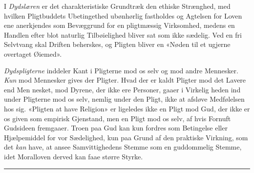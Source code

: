 \documentclass[12pt,a4paper]{book}
\newcommand{\divrule}{\begin{center}\rule{2cm}{0.4pt}\end{center}}
\begin{document}
I \emph{Dydslæren} er det charakteristiske Grundtræk den
ethiske Strænghed, med hvilken Pligtbuddets Ubetingethed
ubønhørlig fastholdes og Agtelsen for Loven ene anerkjendes
som Bevæggrund for en pligtmæssig Virksomhed, medens en
Handlen efter blot naturlig Tilbøielighed bliver sat som ikke\-%
sædelig. Ved en fri Selvtvang skal Driften beherskes, og
Pligten bliver en «Nøden til et ugjerne overtaget Øiemed».

\emph{Dydspligterne} inddeler Kant i Pligterne mod os selv
og mod andre Mennesker. \emph{Kun} mod Mennesker gives der
Pligter. Hvad der er kaldt Pligter mod det Lavere end Men\-%
nesket, mod Dyrene, der ikke ere Personer, gaaer i Virkelig\-%
heden ind under Pligterne mod os selv, nemlig under den
Pligt, ikke at afsløve Medfølelsen hos sig. «Pligten at have
Religion» er ligeledes ikke en Pligt mod Gud, der ikke er os
given som empirisk Gjenstand, men en Pligt mod os selv, af hvis
Fornuft Gudsideen fremgaaer. Troen paa Gud kan kun fordres
som Betingelse eller Hjælpemiddel for vor Sædelighed, kun
paa Grund af den praktiske Virkning, som det \emph{kan} have, at
ansee Samvittighedens Stemme som en guddommelig Stemme,
idet Moralloven derved kan faae større Styrke.

\divrule
\end{document}
